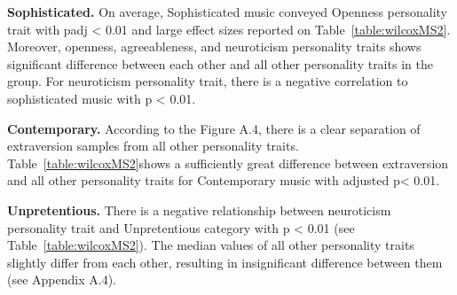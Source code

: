 \par \textbf{Sophisticated.} On average, Sophisticated music conveyed Openness personality trait with padj < 0.01
and large effect sizes reported on Table~\ref{table:wilcoxMS2}. Moreover, openness, agreeableness, and neuroticism
personality traits shows significant difference between each other and all other personality traits in the group.
For neuroticism personality trait, there is a negative correlation to sophisticated music with p < 0.01.
\par \textbf{Contemporary.} According to the Figure A.4, there is a clear separation of extraversion samples from all
other personality traits. Table~\ref{table:wilcoxMS2}shows a sufficiently great difference between extraversion and all
other personality traits for Contemporary music with adjusted p< 0.01.
\par \textbf{Unpretentious.} There is a negative relationship between neuroticism personality trait and Unpretentious
category with p < 0.01 (see Table~\ref{table:wilcoxMS2}). The median values of all other personality traits slightly
differ from each other, resulting in insignificant difference between them (see Appendix A.4).

